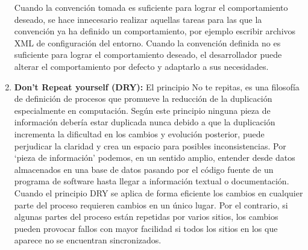 \begin{enumerate}
Cuando la convención tomada es suficiente para lograr el comportamiento deseado, se hace innecesario realizar aquellas tareas para las que la convención ya ha definido un comportamiento, por ejemplo escribir archivos XML de configuración del entorno. Cuando la convención definida no es suficiente para lograr el comportamiento deseado, el desarrollador puede alterar el comportamiento por defecto y adaptarlo a sus necesidades.
\item \textbf{Don't Repeat yourself (DRY):} El principio No te repitas, es una filosofía de definición de procesos que promueve la reducción de la duplicación especialmente en computación. Según este principio ninguna pieza de información debería estar duplicada nunca debido a que la duplicación incrementa la dificultad en los cambios y evolución posterior, puede perjudicar la claridad y crea un espacio para posibles inconsistencias. Por `pieza de información' podemos, en un sentido amplio, entender desde datos almacenados en una base de datos pasando por el código fuente de un programa de software hasta llegar a información textual o documentación.
Cuando el principio DRY se aplica de forma eficiente los cambios en cualquier parte del proceso requieren cambios en un único lugar. Por el contrario, si algunas partes del proceso están repetidas por varios sitios, los cambios pueden provocar fallos con mayor facilidad si todos los sitios en los que aparece no se encuentran sincronizados.
\end{enumerate}